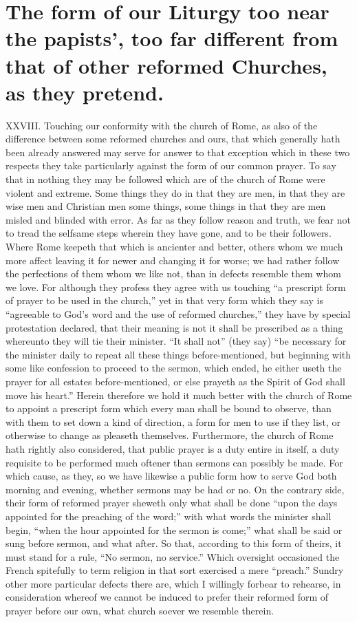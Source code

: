 \section*{The form of our Liturgy too near the papists’, too far different from that of other reformed Churches, as they pretend.}
XXVIII. Touching our conformity with the church of Rome, as also of the difference between some reformed churches and ours, that which generally hath been already answered may serve for answer to that exception which in these two respects they take particularly against the form of our common prayer. To say that in nothing they may be followed which are of the church of Rome were violent and extreme. Some things they do in that they are men, in that they are wise men and Christian men some things, some things in that they are men misled and blinded with error. As far as they follow reason and truth, we fear not to tread the selfsame steps wherein they have gone, and to be their followers. Where Rome keepeth that which is ancienter and better, others whom we much more affect leaving it for newer and changing it for worse; we had rather follow the perfections of them whom we like not, than in defects resemble them whom we love.
For although they profess they agree with us touching “a prescript form of prayer to be used in the church,” yet in that very form which they say is “agreeable to God’s word and the use of reformed churches,” they have by special protestation declared, that their meaning is not it shall be prescribed as a thing whereunto they will tie their minister. “It shall not” (they say) “be necessary for the minister daily to repeat all these things before-mentioned, but beginning with some like confession to proceed to the sermon, which ended, he either useth the prayer for all estates before-mentioned, or else prayeth as the Spirit of God shall move his heart.” Herein therefore we hold it much better with the church of Rome to appoint a prescript form which every  man shall be bound to observe, than with them to set down a kind of direction, a form for men to use if they list, or otherwise to change as pleaseth themselves.
Furthermore, the church of Rome hath rightly also considered, that public prayer is a duty entire in itself, a duty requisite to be performed much oftener than sermons can possibly be made. For which cause, as they, so we have likewise a public form how to serve God both morning and evening, whether sermons may be had or no. On the contrary side, their form of reformed prayer sheweth only what shall be done “upon the days appointed for the preaching of the word;” with what words the minister shall begin, “when the hour appointed for the sermon is come;” what shall be said or sung before sermon, and what after. So that, according to this form of theirs, it must stand for a rule, “No sermon, no service.” Which oversight occasioned the French spitefully to term religion in that sort exercised a mere “preach.” Sundry other more particular defects there are, which I willingly forbear to rehearse, in consideration whereof we cannot be induced to prefer their reformed form of prayer before our own, what church soever we resemble therein.

